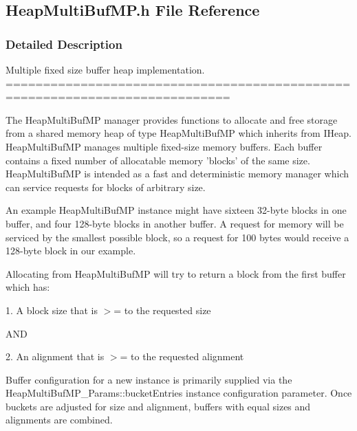 \subsection{HeapMultiBufMP.h File Reference}
\label{_heap_multi_buf_m_p_8h}


\subsubsection{Detailed Description}
Multiple fixed size buffer heap implementation. ============================================================================

The HeapMultiBufMP manager provides functions to allocate and free storage from a shared memory heap of type HeapMultiBufMP which inherits from IHeap. HeapMultiBufMP manages multiple fixed-\/size memory buffers. Each buffer contains a fixed number of allocatable memory 'blocks' of the same size. HeapMultiBufMP is intended as a fast and deterministic memory manager which can service requests for blocks of arbitrary size.

An example HeapMultiBufMP instance might have sixteen 32-\/byte blocks in one buffer, and four 128-\/byte blocks in another buffer. A request for memory will be serviced by the smallest possible block, so a request for 100 bytes would receive a 128-\/byte block in our example.

Allocating from HeapMultiBufMP will try to return a block from the first buffer which has:

1. A block size that is $>$= to the requested size

AND

2. An alignment that is $>$= to the requested alignment

Buffer configuration for a new instance is primarily supplied via the HeapMultiBufMP\_\-Params::bucketEntries instance configuration parameter. Once buckets are adjusted for size and alignment, buffers with equal sizes and alignments are combined.

